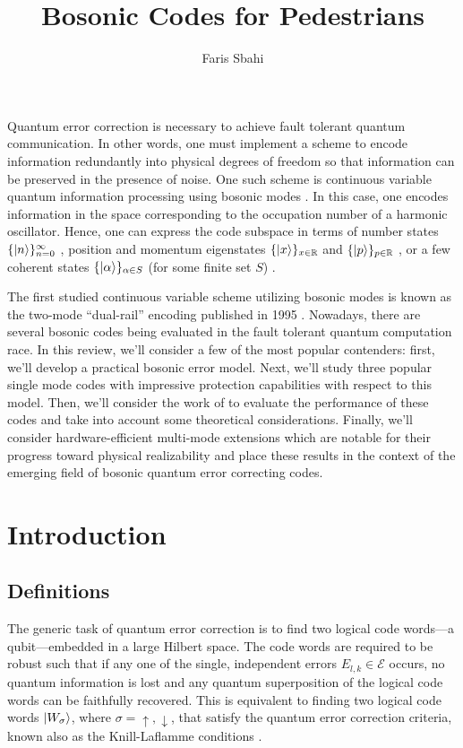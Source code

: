 \documentclass[12]{amsart}
\title{Bosonic Codes for Pedestrians}
\author{Faris Sbahi}
\newcommand\0{\mathbf{0}}
\newcommand\RR{\mathbb{R}}
\newcommand\<{\langle}
\renewcommand\>{\rangle}
\begin{document}
\maketitle

Quantum error correction is necessary to achieve fault tolerant quantum communication. In other words, one must implement a scheme to encode information redundantly into physical degrees of freedom so that information can be preserved in the presence of noise. One such scheme is continuous variable quantum information processing using bosonic modes \cite{braunstein1998error, braunstein2005quantum, niset2008experimentally, aoki2009quantum, lloyd1998analog, lassen2010quantum}. In this case, one encodes information in the space corresponding to the occupation number of a harmonic oscillator. Hence, one can express the code subspace in terms of number states $\{\ket{n}\}^\infty_{n=0}$ \cite{michael2016new}, position and momentum eigenstates $\{\ket{x}\}_{x\in\RR}$ and $\{\ket{p}\}_{p\in\RR}$  \cite{gottesman2001encoding}, or a few coherent states $\{\ket{\alpha}\}_{\alpha\in S}$ (for some finite set $S$) \cite{cochrane1999macroscopically}.

The first studied continuous variable scheme utilizing bosonic modes is known as the two-mode “dual-rail” encoding published in 1995 \cite{chuang1995simple}. Nowadays, there are several bosonic codes being evaluated in the fault tolerant quantum computation race. In this review, we'll consider a few of the most popular contenders: first, we'll develop a practical bosonic error model. Next, we'll study three popular single mode codes with impressive protection capabilities with respect to this model. Then, we'll consider the work of \cite{albert2017performance} to evaluate the performance of these codes and take into account some theoretical considerations. Finally, we'll consider hardware-efficient multi-mode extensions which are notable for their progress toward physical realizability and place these results in the context of the emerging field of bosonic quantum error correcting codes.

\section{Introduction}

\subsection{Definitions}

The generic task of quantum error correction is to find two logical code words---a qubit---embedded in a large Hilbert space. The code words are required to be robust such that if any one of the single, independent errors $E_{l,k} \in \mathcal{E}$ occurs, no quantum information is lost and any quantum superposition of the logical code words can be faithfully recovered. This is equivalent to finding two logical code words $\ket{W_\sigma}$, where $\sigma = \uparrow, \downarrow$, that satisfy the quantum error correction criteria, known also as the Knill-Laflamme conditions \cite{nielsen2002quantum}.
\end{document}
